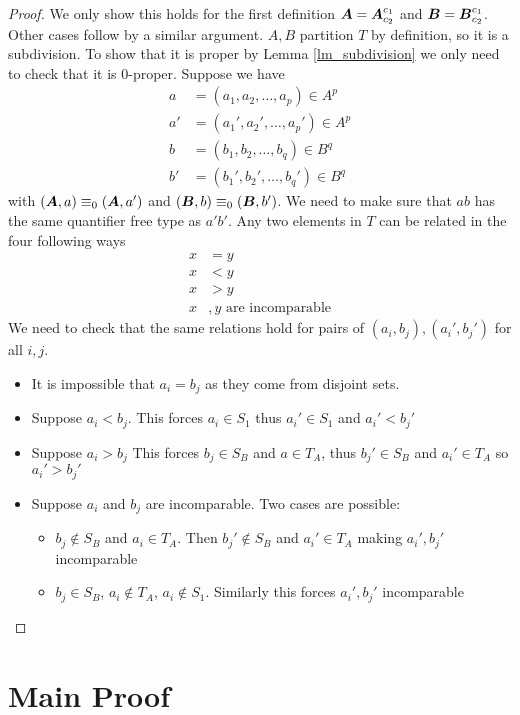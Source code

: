 \documentclass{amsart}
\DeclareMathOperator{\A}{\boldface A}
\DeclareMathOperator{\B}{\boldface B}
\begin{document}
\begin{proof}
	We only show this holds for the first definition $\A = \A^{c_1}_{c_2}$ and $\B = \B^{c_1}_{c_2}$. Other cases follow by a similar argument. $A,B$ partition $T$ by definition, so it is a subdivision. To show that it is proper by Lemma \ref{lm_subdivision} we only need to check that it is $0$-proper. Suppose we have 
	\begin{align*}
		a &= (a_1, a_2, \ldots, a_p) \in A^p \\
		a' &= (a_1', a_2', \ldots, a_p') \in A^p  \\
		b &= (b_1, b_2, \ldots, b_q) \in B^q  \\
		b' &= (b_1', b_2', \ldots, b_q') \in B^q 
	\end{align*}
	with $(\A, a) \equiv_0 (\A, a')$ and $(\B, b) \equiv_0 (\B, b')$. We need to make sure that $ab$ has the same quantifier free type as $a'b'$. Any two elements in $T$ can be related in the four following ways
	\begin{align*}
		x &= y \\
		x &< y \\
		x &> y \\
		x&,y \text{ are incomparable}
	\end{align*}
	We need to check that the same relations hold for pairs of $(a_i, b_j), (a_i', b_j')$ for all $i,j$.
	
	\begin{itemize}
		\item It is impossible that $a_i = b_j$ as they come from disjoint sets.
		\item Suppose $a_i < b_j$. This forces $a_i \in S_1$ thus $a_i' \in S_1$ and $a_i' < b_j'$ 
		\item Suppose $a_i > b_j$ This forces $b_j \in S_B$ and $a \in T_A$, thus $b_j' \in S_B$ and $a_i' \in T_A$ so $a_i' > b_j'$ 
		\item Suppose $a_i$ and $b_j$ are incomparable. Two cases are possible:
		\begin{itemize}
			\item $b_j \notin S_B$ and $a_i \in T_A$. Then $b_j' \notin S_B$ and $a_i' \in T_A$ making $a_i', b_j'$ incomparable
			\item $b_j \in S_B$, $a_i \notin T_A$, $a_i \notin S_1$. Similarly this forces $a_i', b_j'$ incomparable
		\end{itemize}
	\end{itemize}
\end{proof}

\section{Main Proof}
\end{document}
